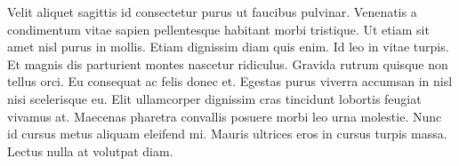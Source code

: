 Velit aliquet sagittis id consectetur purus ut faucibus pulvinar. Venenatis a
condimentum vitae sapien pellentesque habitant morbi tristique. Ut etiam sit
amet nisl purus in mollis. Etiam dignissim diam quis enim. Id leo in vitae
turpis. Et magnis dis parturient montes nascetur ridiculus. Gravida rutrum
quisque non tellus orci. Eu consequat ac felis donec et. Egestas purus viverra
accumsan in nisl nisi scelerisque eu. Elit ullamcorper dignissim cras tincidunt
lobortis feugiat vivamus at. Maecenas pharetra convallis posuere morbi leo urna
molestie. Nunc id cursus metus aliquam eleifend mi. Mauris ultrices eros in
cursus turpis massa. Lectus nulla at volutpat diam.

